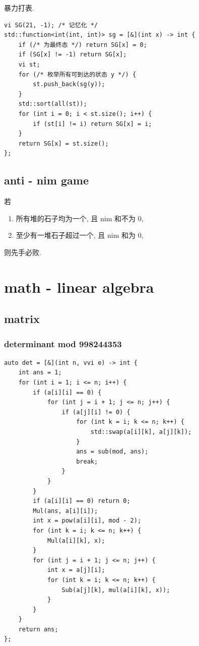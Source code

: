 \documentclass[UTF8, a4paper, titlepage, twoside]{ctexart}
\begin{document}
暴力打表.
\begin{lstlisting}[style=cpp]
vi SG(21, -1); /* 记忆化 */
std::function<int(int, int)> sg = [&](int x) -> int {
    if (/* 为最终态 */) return SG[x] = 0;
    if (SG[x] != -1) return SG[x];
    vi st;
    for (/* 枚举所有可到达的状态 y */) {
        st.push_back(sg(y));
    }
    std::sort(all(st));
    for (int i = 0; i < st.size(); i++) {
        if (st[i] != i) return SG[x] = i;
    }
    return SG[x] = st.size();
};
\end{lstlisting}

\subsection{ anti - nim game }
若
\begin{enumerate}
    \item 所有堆的石子均为一个, 且 nim 和不为 0, 
    \item 至少有一堆石子超过一个, 且 nim 和为 0,
\end{enumerate}
则先手必败.

\newpage
\section{ math - linear algebra}
\subsection{ matrix }
\subsubsection*{ determinant mod 998244353}
\begin{lstlisting}[style=cpp]
auto det = [&](int n, vvi e) -> int {
    int ans = 1;
    for (int i = 1; i <= n; i++) {
        if (a[i][i] == 0) {
            for (int j = i + 1; j <= n; j++) {
                if (a[j][i] != 0) {
                    for (int k = i; k <= n; k++) {
                        std::swap(a[i][k], a[j][k]);
                    }
                    ans = sub(mod, ans);
                    break;
                }
            }
        }
        if (a[i][i] == 0) return 0;
        Mul(ans, a[i][i]);
        int x = pow(a[i][i], mod - 2);
        for (int k = i; k <= n; k++) {
            Mul(a[i][k], x);
        }
        for (int j = i + 1; j <= n; j++) {
            int x = a[j][i];
            for (int k = i; k <= n; k++) {
                Sub(a[j][k], mul(a[i][k], x));
            }
        }
    }
    return ans;
};
\end{lstlisting}
\end{document}
